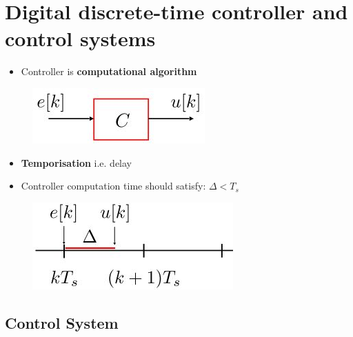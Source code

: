 \documentclass[conference]{IEEEtran}
\begin{document}
\section{Digital discrete-time controller and control systems}

\begin{itemize}
    \item Controller is \textbf{computational algorithm}
\end{itemize}
\begin{figure} [h!]
    \centering
    \includegraphics[scale=0.6]{Ex8.JPG}
\end{figure}
\begin{itemize}
    \item \textbf{Temporisation} i.e. delay
    \item Controller computation time should satisfy: $\Delta < T_s$ 
\end{itemize}
\begin{figure} [h!]
    \centering
    \includegraphics[scale=0.6]{Ex9.JPG}
\end{figure}

\subsection{Control System}
\end{document}
